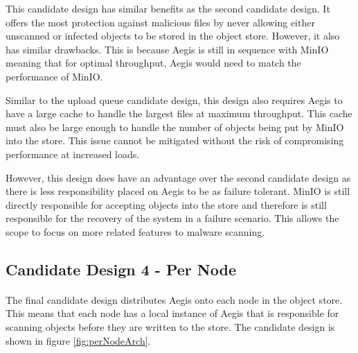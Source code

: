 \documentclass[12pt, conference, final, a4paper, onecolumn, compsoc]{IEEEtran}
\begin{document}
This candidate design has similar benefits as the second candidate design. It
offers the most protection against malicious files by never allowing either
unscanned or infected objects to be stored in the object store. However, it also
has similar drawbacks. This is because Aegis is still in sequence with MinIO
meaning that for optimal throughput, Aegis would need to match the performance
of MinIO.

Similar to the upload queue candidate design, this design also requires Aegis to
have a large cache to handle the largest files at maximum throughput. This cache
must also be large enough to handle the number of objects being put by MinIO
into the store. This issue cannot be mitigated without the risk of compromising
performance at increased loads.

However, this design does have an advantage over the second candidate design as
there is less responsibility placed on Aegis to be as failure tolerant. MinIO is
still directly responsible for accepting objects into the store and therefore is
still responsible for the recovery of the system in a failure scenario. This
allows the scope to focus on more related features to malware scanning.


\subsection*{Candidate Design 4 - Per Node}
\paragraph{}

The final candidate design distributes Aegis onto each node in the object store.
This means that each node has a local instance of Aegis that is responsible for
scanning objects before they are written to the store. The candidate design is
shown in figure \ref{fig:perNodeArch}.
\end{document}
